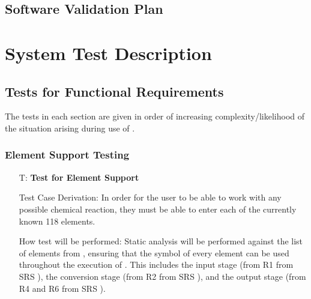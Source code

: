 \documentclass[12pt, titlepage]{article}
\newcounter{testnum} %
\begin{document}
\subsection{Software Validation Plan}




\section{System Test Description} \label{sec_sys_tests}

\subsection{Tests for Functional Requirements} \label{sec_sysFunReqs}

The tests in each section are given in order of increasing
complexity/likelihood of the situation arising during use of \progname{}.

\subsubsection{Element Support Testing}

\begin{enumerate}

  \item[T\refstepcounter{testnum}\thetestnum \label{test_element_support}:]
    \textbf{Test for Element Support}

    Test Case Derivation: In order for the user to be able to work with any
    possible chemical reaction, they must be able to enter each of the
    currently known 118 elements.

    How test will be performed: Static analysis will be performed against the
    list of elements from \cite{helmenstine_list_2020}, ensuring that the
    symbol of every element can be used throughout the execution of
    \progname{}. This includes the input stage (from R1 from SRS ), the conversion stage (from R2 from SRS ), and the
    output stage (from R4 and R6 from SRS ).

\end{enumerate}
\end{document}
